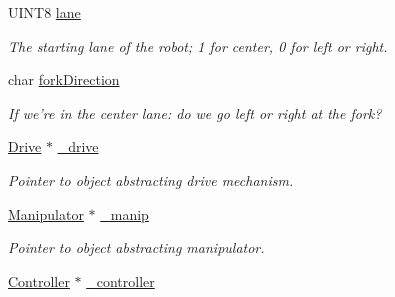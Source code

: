 \begin{DoxyCompactItemize}
\item 
\hypertarget{class_r_j_f_r_c2011_1_1_autonomous_a3002d35266aa29ddaec363130fb5d12b}{
UINT8 \hyperlink{class_r_j_f_r_c2011_1_1_autonomous_a3002d35266aa29ddaec363130fb5d12b}{lane}}
\label{class_r_j_f_r_c2011_1_1_autonomous_a3002d35266aa29ddaec363130fb5d12b}

\begin{DoxyCompactList}\small\item\em The starting lane of the robot; 1 for center, 0 for left or right. \item\end{DoxyCompactList}\item 
\hypertarget{class_r_j_f_r_c2011_1_1_autonomous_ab7681c337943ad6600c39e1be0027bbd}{
char \hyperlink{class_r_j_f_r_c2011_1_1_autonomous_ab7681c337943ad6600c39e1be0027bbd}{forkDirection}}
\label{class_r_j_f_r_c2011_1_1_autonomous_ab7681c337943ad6600c39e1be0027bbd}

\begin{DoxyCompactList}\small\item\em If we're in the center lane: do we go left or right at the fork? \item\end{DoxyCompactList}\item 
\hypertarget{class_r_j_f_r_c2011_1_1_autonomous_a6ca6803f40fe02528cbddae4df3fc53c}{
\hyperlink{class_r_j_f_r_c2011_1_1_drive}{Drive} $\ast$ \hyperlink{class_r_j_f_r_c2011_1_1_autonomous_a6ca6803f40fe02528cbddae4df3fc53c}{\_\-drive}}
\label{class_r_j_f_r_c2011_1_1_autonomous_a6ca6803f40fe02528cbddae4df3fc53c}

\begin{DoxyCompactList}\small\item\em Pointer to object abstracting drive mechanism. \item\end{DoxyCompactList}\item 
\hypertarget{class_r_j_f_r_c2011_1_1_autonomous_a938412c0aafbe49631d154b04328c5d2}{
\hyperlink{class_r_j_f_r_c2011_1_1_manipulator}{Manipulator} $\ast$ \hyperlink{class_r_j_f_r_c2011_1_1_autonomous_a938412c0aafbe49631d154b04328c5d2}{\_\-manip}}
\label{class_r_j_f_r_c2011_1_1_autonomous_a938412c0aafbe49631d154b04328c5d2}

\begin{DoxyCompactList}\small\item\em Pointer to object abstracting manipulator. \item\end{DoxyCompactList}\item 
\hypertarget{class_r_j_f_r_c2011_1_1_autonomous_a2cced8bfdcdcfdd4ac8603aa96d56781}{
\hyperlink{class_r_j_f_r_c2011_1_1_controller}{Controller} $\ast$ \hyperlink{class_r_j_f_r_c2011_1_1_autonomous_a2cced8bfdcdcfdd4ac8603aa96d56781}{\_\-controller}}
\label{class_r_j_f_r_c2011_1_1_autonomous_a2cced8bfdcdcfdd4ac8603aa96d56781}


\end{DoxyCompactItemize}
